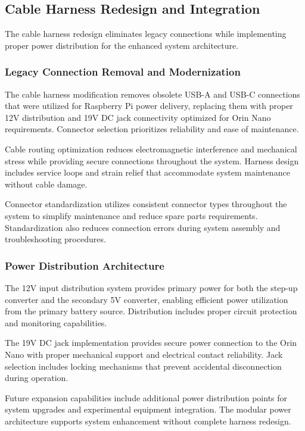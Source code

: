 \subsection{Cable Harness Redesign and Integration}

The cable harness redesign eliminates legacy connections while implementing proper power distribution for the enhanced system architecture.

\subsubsection{Legacy Connection Removal and Modernization}

The cable harness modification removes obsolete USB-A and USB-C connections that were utilized for Raspberry Pi power delivery, replacing them with proper 12V distribution and 19V DC jack connectivity optimized for Orin Nano requirements. Connector selection prioritizes reliability and ease of maintenance.

Cable routing optimization reduces electromagnetic interference and mechanical stress while providing secure connections throughout the system. Harness design includes service loops and strain relief that accommodate system maintenance without cable damage.

Connector standardization utilizes consistent connector types throughout the system to simplify maintenance and reduce spare parts requirements. Standardization also reduces connection errors during system assembly and troubleshooting procedures.

\subsubsection{Power Distribution Architecture}

The 12V input distribution system provides primary power for both the step-up converter and the secondary 5V converter, enabling efficient power utilization from the primary battery source. Distribution includes proper circuit protection and monitoring capabilities.

The 19V DC jack implementation provides secure power connection to the Orin Nano with proper mechanical support and electrical contact reliability. Jack selection includes locking mechanisms that prevent accidental disconnection during operation.

Future expansion capabilities include additional power distribution points for system upgrades and experimental equipment integration. The modular power architecture supports system enhancement without complete harness redesign.

